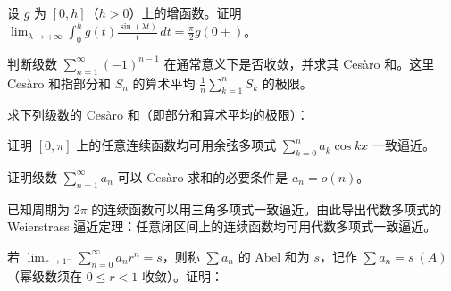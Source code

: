 \noindent\begin{minipage}{\textwidth}
设 $g$ 为 $[0,h]$（$h>0$）上的增函数。证明 $\displaystyle\lim_{\lambda\to+\infty}\int_0^h g(t)\frac{\sin(\lambda t)}t\,dt=\frac\pi2g(0+)$。
\end{minipage}\par\vfill
\noindent\begin{minipage}{\textwidth}
判断级数 $\displaystyle\sum_{n=1}^{\infty}(-1)^{n-1}$ 在通常意义下是否收敛，并求其 Cesàro 和。这里 Cesàro 和指部分和 $S_n$ 的算术平均 $\displaystyle\frac1n\sum_{k=1}^n S_k$ 的极限。
\end{minipage}\par\vfill
\newpage
\noindent\begin{minipage}{\textwidth}
求下列级数的 Cesàro 和（即部分和算术平均的极限）：
\end{minipage}\par\vfill
\noindent\begin{minipage}{\textwidth}
证明 $[0,\pi]$ 上的任意连续函数均可用余弦多项式 $\displaystyle\sum_{k=0}^n a_k\cos kx$ 一致逼近。
\end{minipage}\par\vfill
\noindent\begin{minipage}{\textwidth}
证明级数 $\displaystyle\sum_{n=1}^\infty a_n$ 可以 Cesàro 求和的必要条件是 $a_n=o(n)$。
\end{minipage}\par\vfill
\newpage
\noindent\begin{minipage}{\textwidth}
已知周期为 $2\pi$ 的连续函数可以用三角多项式一致逼近。由此导出代数多项式的 Weierstrass 逼近定理：任意闭区间上的连续函数均可用代数多项式一致逼近。
\end{minipage}\par\vfill
\noindent\begin{minipage}{\textwidth}
若 $\displaystyle\lim_{r\to1^-}\sum_{n=0}^\infty a_n r^n=s$，则称 $\sum a_n$ 的 Abel 和为 $s$，记作 $\sum a_n=s\ (A)$（幂级数须在 $0\le r<1$ 收敛）。证明：
\end{minipage}\par\vfill
